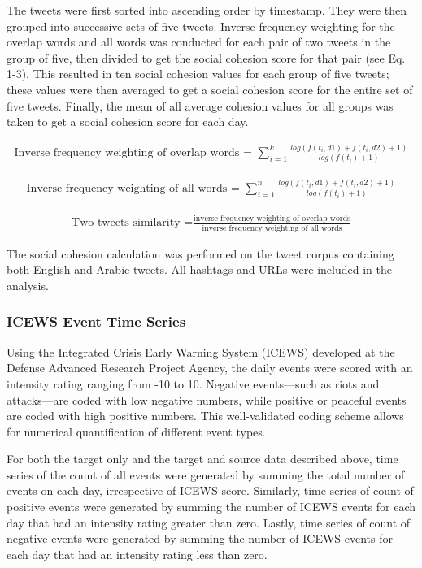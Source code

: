 \documentclass[english,man]{apa6}
\begin{document}
The tweets were first sorted into ascending order by timestamp. They were
then grouped into successive sets of five tweets. Inverse frequency
weighting for the overlap words and all words was conducted for each pair
of two tweets in the group of five, then divided to get the social cohesion
score for that pair (see Eq. 1-3). This resulted in ten social cohesion
values for each group of five tweets; these values were then averaged to get
a social cohesion score for the entire set of five tweets. Finally,
the mean of all average cohesion values for all groups was taken to get
a social cohesion score for each day.

\begin{align}
\text{Inverse frequency weighting of overlap words = }\sum_{i=1}^k \frac{log(f(t_i, d1) + f(t_i, d2) + 1)}{log(f(t_i) + 1)}
\end{align}

\begin{align}
\text{Inverse frequency weighting of all words = }\sum_{i=1}^n \frac{log(f(t_i, d1) + f(t_i, d2) + 1)}{log(f(t_i) + 1)}
\end{align}

\begin{align}
\text{Two tweets similarity =}\frac{\text{inverse frequency weighting of overlap words}}{\text{inverse frequency weighting of all words}}
\end{align}

The social cohesion calculation was performed on the tweet corpus
containing both English and Arabic tweets. All hashtags and URLs were included
in the analysis.

\hypertarget{icews-event-time-series}{%
\subsubsection{ICEWS Event Time Series}\label{icews-event-time-series}}

Using the Integrated Crisis Early Warning System (ICEWS) developed at the
Defense Advanced Research Project Agency, the daily events were
scored with an intensity rating ranging from -10 to 10. Negative
events---such as riots and attacks---are coded with low negative numbers, while
positive or peaceful events are coded with high positive numbers. This
well-validated coding scheme allows for numerical quantification of
different event types.

For both the target only and the target and source data described above, time series of
the count of all events were generated by summing the total number of events
on each day, irrespective of ICEWS score. Similarly, time series of count
of positive events were generated by summing the number of ICEWS events
for each day that had an intensity rating greater than zero. Lastly,
time series of count of negative events were generated by summing the number
of ICEWS events for each day that had an intensity rating less than zero.
\end{document}
